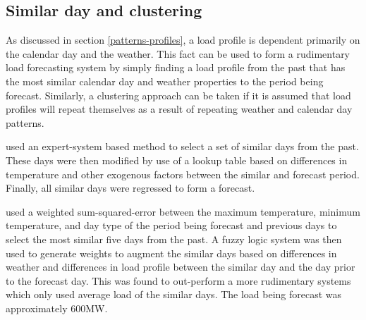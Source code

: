 \subsection{Similar day and clustering}
As discussed in section \ref{patterns-profiles}, a load profile is dependent primarily on the calendar day and the weather.
This fact can be used to form a rudimentary load forecasting system by simply finding a load profile from the past that has the most similar calendar day and weather properties to the period being forecast. 
Similarly, a clustering approach can be taken if it is assumed that load profiles will repeat themselves as a result of repeating weather and calendar day patterns.
\par
\citet{Rahman1993} used an expert-system based method to select a set of similar days from the past. 
These days were then modified by use of a lookup table based on differences in temperature and other exogenous factors between the similar and forecast period.
Finally, all similar days were regressed to form a forecast.
\par
\citet{Senjyu1998} used a weighted sum-squared-error between the maximum temperature, minimum temperature, and day type of the period being forecast and previous days to select the most similar five days from the past.
A fuzzy logic system was then used to generate weights to augment the similar days based on differences in weather and differences in load profile between the similar day and the day prior to the forecast day.
This was found to out-perform a more rudimentary systems which only used average load of the similar days.
The load being forecast was approximately 600MW.
\par
{}


